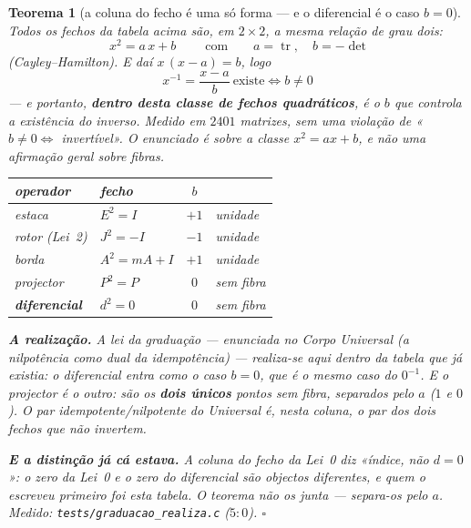\documentclass[11pt,a4paper]{article}
\newtheorem{teorema}{Teorema}
\newcommand{\code}[1]{\texttt{#1}}
\begin{document}
\begin{teorema}[a coluna do fecho é uma só forma --- e o diferencial é o
caso $b=0$]\label{thm:fecho-b}
Todos os fechos da tabela acima são, em $2\times2$, a \emph{mesma}
relação de grau dois:
\[
\boxed{\;x^{2}=a\,x+b\;}
\qquad\text{com}\qquad
a=\operatorname{tr},\quad b=-\det
\]
(Cayley--Hamilton). E daí $x\,(x-a)=b$, logo
\[
\boxed{\;x^{-1}=\frac{x-a}{b}\ \text{existe}\iff b\neq0\;}
\]
--- e portanto, \textbf{dentro desta classe de fechos quadráticos}, é o
$b$ que controla a existência do inverso. Medido em $2401$ matrizes,
sem uma violação de «$b\neq0\iff$ invertível». \emph{O enunciado é
sobre a classe $x^{2}=ax+b$, e não uma afirmação geral sobre fibras.}
\begin{center}\small
\begin{tabular}{@{}llcl@{}}
\toprule
operador & fecho & $b$ & \\
\midrule
estaca & $E^{2}=I$ & $+1$ & unidade \\
rotor (Lei~2) & $J^{2}=-I$ & $-1$ & unidade \\
borda & $A^{2}=mA+I$ & $+1$ & unidade \\
projector & $P^{2}=P$ & $0$ & \emph{sem fibra} \\
\textbf{diferencial} & $d^{2}=0$ & $0$ & \emph{sem fibra} \\
\bottomrule
\end{tabular}
\end{center}
\noindent \textbf{A realização.} A lei da graduação --- enunciada no
\emph{Corpo Universal} (a nilpotência como dual da idempotência) ---
realiza-se aqui \emph{dentro da tabela que já existia}: o diferencial
entra como o caso $b=0$, que é o mesmo caso do $0^{-1}$. E o projector
é o outro: são os \textbf{dois únicos} pontos sem fibra, separados pelo
$a$ ($1$ e $0$). O par idempotente/nilpotente do Universal é, nesta
coluna, o par dos dois fechos que não invertem.

\noindent \textbf{E a distinção já cá estava.} A coluna do fecho da
Lei~0 diz «índice, \emph{não} $d=0$»: o zero da Lei~0 e o zero do
diferencial são objectos diferentes, e quem o escreveu primeiro foi
esta tabela. O teorema não os junta --- separa-os pelo $a$.
\emph{Medido:} \code{tests/graduacao\_realiza.c} ($5{:}0$).
$\square$
\end{teorema}
\end{document}
